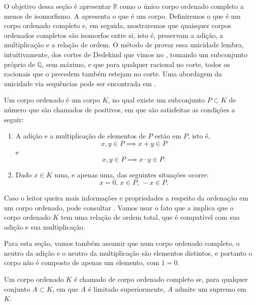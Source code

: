 \documentclass[../main.tex]{subfiles}
\begin{document}
O objetivo dessa seção é apresentar $\mathbb{R}$ como o único corpo ordenado completo a menos de isomorfismo. A  apresenta o que é um corpo. Definiremos o que é um corpo ordenado completo e, em seguida, mostraremos que quaisquer corpos ordenados completos são isomorfos entre si, isto é, preservam a adição, a multiplicação e a relação de ordem. O método de provar essa unicidade lembra, intuitivamente, dos cortes de Dedekind que vimos no , tomando um subconjunto próprio de $\mathbb{Q}$, sem máximo, e que para qualquer racional no corte, todos os racionais que o precedem também estejam no corte. Uma abordagem da unicidade via sequências pode ser encontrada em \textcite{hefez-algebra}.

\begin{defi}\label{enum-def-corpoOrdenado}
    Um corpo  ordenado é um corpo $K$, no qual existe um subconjunto $P \subset K$ de número que são chamados de positivos, em que são satisfeitas as condições a seguir:
    \begin{enumerate}
        \item A adição e a multiplicação de elementos de $P$ estão em $P$, isto é, 
        \[ x,y \in P \implies x+y \in P \] e \[ x,y \in P \implies x \cdot y \in P.\]
        \item Dado $x \in K$ uma, e apenas uma, das seguintes situações ocorre: 
        \[x = 0\text{, }x \in P\text{, }-x \in P. \]
    \end{enumerate}
\end{defi}
\begin{obs}
    Caso o leitor queira mais informações e propriedades a respeito da ordenação em um corpo ordenado, pode consultar \textcite[p. 65]{lima-analise-1}.
    Vamos usar o fato que a  implica que o corpo ordenado $K$ tem uma relação de ordem total, que é compatível com sua adição e sua multiplicação.
\end{obs}
\begin{obs}
    Para esta seção, vamos também assumir que num corpo ordenado completo, o neutro da adição e o neutro da multiplicação são elementos distintos, e portanto o corpo não é composto de apenas um elemento, com $1=0$.
\end{obs}
\begin{defi}\label{enum-def-corpoOrdenadoCompleto}
    Um corpo ordenado $K$ é chamado de corpo ordenado completo se, para qualquer conjunto $A \subset K$, em que $A$ é limitado superiormente, $A$ admite um supremo em $K$. 
\end{defi}
\end{document}
